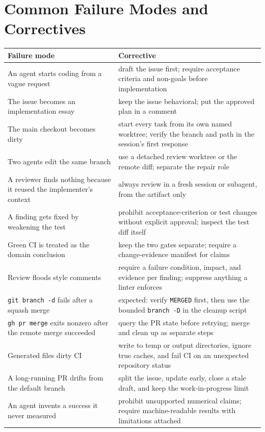 \documentclass[11pt]{article}
\newcommand{\co}[1]{\lstinline[basicstyle=\ttfamily\color{gwInk}]{#1}}
\begin{document}
\section{Common Failure Modes and Correctives}

\begin{center}
\begin{tabularx}{\textwidth}{@{}Y Y@{}}
\toprule
\textbf{Failure mode} & \textbf{Corrective} \\
\midrule
An agent starts coding from a vague request & draft the issue first; require acceptance criteria
  and non-goals before implementation \\
The issue becomes an implementation essay & keep the issue behavioral; put the approved plan in
  a comment \\
The main checkout becomes dirty & start every task from its own named worktree; verify the
  branch and path in the session's first response \\
Two agents edit the same branch & use a detached review worktree or the remote diff; separate
  the repair role \\
A reviewer finds nothing because it reused the implementer's context & always review in a fresh
  session or subagent, from the artifact only \\
A finding gets fixed by weakening the test & prohibit acceptance-criterion or test changes
  without explicit approval; inspect the test diff itself \\
Green CI is treated as the domain conclusion & keep the two gates separate; require a
  change-evidence manifest for claims \\
Review floods style comments & require a failure condition, impact, and evidence per finding;
  suppress anything a linter enforces \\
\co{git branch -d} fails after a squash merge & expected: verify \co{MERGED} first, then use the
  bounded \co{branch -D} in the cleanup script \\
\co{gh pr merge} exits nonzero after the remote merge succeeded & query the PR state before
  retrying; merge and clean up as separate steps \\
Generated files dirty CI & write to temp or output directories, ignore true caches, and fail CI
  on an unexpected repository status \\
A long-running PR drifts from the default branch & split the issue, update early, close a stale
  draft, and keep the work-in-progress limit \\
An agent invents a success it never measured & prohibit unsupported numerical claims; require
  machine-readable results with limitations attached \\
\bottomrule
\end{tabularx}
\end{center}
\end{document}
